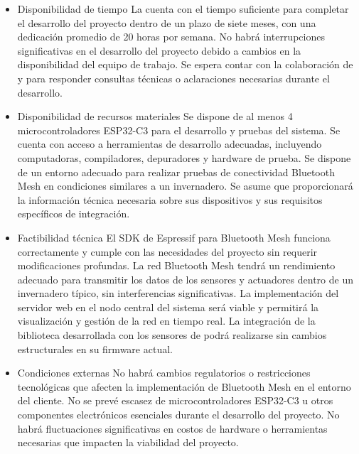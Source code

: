 \documentclass[
11pt, %
]{charter}
\begin{document}
\begin{itemize}
\item Disponibilidad de tiempo
\subitem La {\authorname} cuenta con el tiempo suficiente para completar el desarrollo del proyecto dentro de un plazo de siete meses, con una dedicación promedio de 20 horas por semana. 
\subitem No habrá interrupciones significativas en el desarrollo del proyecto debido a cambios en la disponibilidad del equipo de trabajo.
\subitem Se espera contar con la colaboración de {\clientename} y {\empclientename} para responder consultas técnicas o aclaraciones necesarias durante el desarrollo.

\item Disponibilidad de recursos materiales
\subitem Se dispone de al menos 4 microcontroladores ESP32-C3 para el desarrollo y pruebas del sistema.
\subitem Se cuenta con acceso a herramientas de desarrollo adecuadas, incluyendo computadoras, compiladores, depuradores y hardware de prueba.
\subitem Se dispone de un entorno adecuado para realizar pruebas de conectividad Bluetooth Mesh en condiciones similares a un invernadero.
\subitem Se asume que {\empclientename} proporcionará la información técnica necesaria sobre sus dispositivos y sus requisitos específicos de integración.

\item Factibilidad técnica
\subitem El SDK de Espressif para Bluetooth Mesh funciona correctamente y cumple con las necesidades del proyecto sin requerir modificaciones profundas.
\subitem La red Bluetooth Mesh tendrá un rendimiento adecuado para transmitir los datos de los sensores y actuadores dentro de un invernadero típico, sin interferencias significativas.
\subitem La implementación del servidor web en el nodo central del sistema será viable y permitirá la visualización y gestión de la red en tiempo real.
\subitem La integración de la biblioteca desarrollada con los sensores de {\empclientename} podrá realizarse sin cambios estructurales en su firmware actual.

\item Condiciones externas
\subitem No habrá cambios regulatorios o restricciones tecnológicas que afecten la implementación de Bluetooth Mesh en el entorno del cliente.
\subitem No se prevé escasez de microcontroladores ESP32-C3 u otros componentes electrónicos esenciales durante el desarrollo del proyecto.
\subitem No habrá fluctuaciones significativas en costos de hardware o herramientas necesarias que impacten la viabilidad del proyecto.
\end{itemize}
\end{document}
